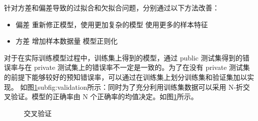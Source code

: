 针对方差和偏差导致的过拟合和欠拟合问题，分别通过以下方法改善：
\begin{itemize}
\item 偏差
	\subitem 重新修正模型，使用更加复杂的模型
	\subitem 使用更多的样本特征
\item 方差
	\subitem 增加样本数据量
	\subitem 模型正则化
\end{itemize}

对于在实际训练模型过程中，训练集上得到的模型，通过 public 测试集得到的错误率与在 private 测试集上的错误率不一定是一致的。为了在没有 private 测试集的前提下能够较好的预知错误率，可以通过在训练集上划分训练集和验证集加以实现。
如图\ref{fig:cross_validation}{subfig:validation}所示：同时为了充分利用训练集数据可以采用 N-折交叉验证。模型的正确率由 N 个正确率的均值决定。如图\ref{fig:cross_validation}所示。
\begin{figure}
	\centering

	{\qquad
	}
	\caption{交叉验证}
	\label{fig:cross_validation}
\end{figure}
